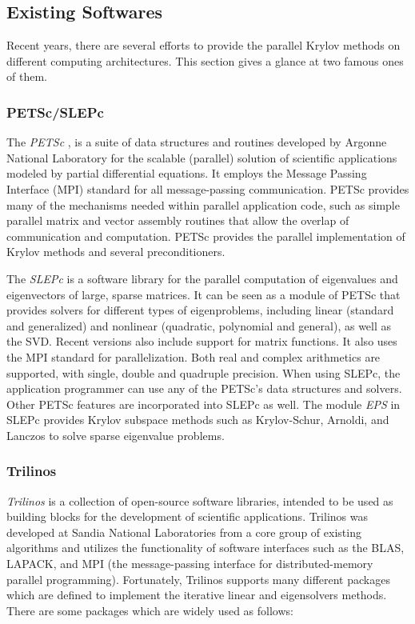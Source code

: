 {\subsection{Existing Softwares}

Recent years, there are several efforts to provide the parallel Krylov methods on different computing architectures. This section gives a glance at two famous ones of them.

\subsubsection{PETSc/SLEPc} 

The \textit{PETSc} \cite{balay2001petsc}, is a suite of data structures and routines developed by Argonne National Laboratory for the scalable (parallel) solution of scientific applications modeled by partial differential equations. It employs the Message Passing Interface (MPI) standard for all message-passing communication. PETSc provides many of the mechanisms needed within parallel application code, such as simple parallel matrix and vector assembly routines that allow the overlap of communication and computation. PETSc provides the parallel implementation of Krylov methods and several preconditioners.

The \textit{SLEPc} \cite{hernandez2005slepc} is a software library for the parallel computation of eigenvalues and eigenvectors of large, sparse matrices. It can be seen as a module of PETSc that provides solvers for different types of eigenproblems, including linear (standard and generalized) and nonlinear (quadratic, polynomial and general), as well as the SVD. Recent versions also include support for matrix functions. It also uses the MPI standard for parallelization. Both real and complex arithmetics are supported, with single, double and quadruple precision. When using SLEPc, the application programmer can use any of the PETSc's data structures and solvers. Other PETSc features are incorporated into SLEPc as well. The module \textit{EPS} in SLEPc provides Krylov subspace methods such as Krylov-Schur, Arnoldi, and Lanczos to solve sparse eigenvalue problems.

\subsubsection{Trilinos} 

\textit{Trilinos} \cite{heroux2005overview} is a collection of open-source software libraries, intended to be used as building blocks for the development of scientific applications. Trilinos was developed at Sandia National Laboratories from a core group of existing algorithms and utilizes the functionality of software interfaces such as the BLAS, LAPACK, and MPI (the message-passing interface for distributed-memory parallel programming). Fortunately, Trilinos supports many different packages which are defined to implement the iterative linear and eigensolvers methods. There are some packages which are widely used as follows:

}
